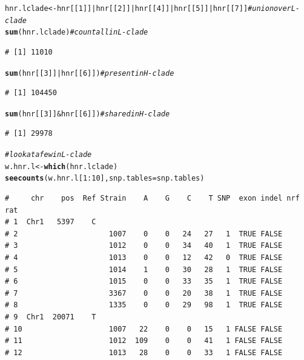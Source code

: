 \documentclass{article}\usepackage[]{graphicx}\usepackage[]{color}
\makeatletter
\newcommand{\hlnum}[1]{\textcolor[rgb]{0.686,0.059,0.569}{#1}}%
\newcommand{\hlcom}[1]{\textcolor[rgb]{0.678,0.584,0.686}{\textit{#1}}}%
\newcommand{\hlopt}[1]{\textcolor[rgb]{0,0,0}{#1}}%
\newcommand{\hlstd}[1]{\textcolor[rgb]{0.345,0.345,0.345}{#1}}%
\newcommand{\hlkwb}[1]{\textcolor[rgb]{0.69,0.353,0.396}{#1}}%
\newcommand{\hlkwc}[1]{\textcolor[rgb]{0.333,0.667,0.333}{#1}}%
\newcommand{\hlkwd}[1]{\textcolor[rgb]{0.737,0.353,0.396}{\textbf{#1}}}%
\newenvironment{kframe}{%
 \def\at@end@of@kframe{}%
 \ifinner\ifhmode%
  \def\at@end@of@kframe{\end{minipage}}%
  \begin{minipage}{\columnwidth}%
 \fi\fi%
 \def\FrameCommand##1{\hskip\@totalleftmargin \hskip-\fboxsep
 \colorbox{shadecolor}{##1}\hskip-\fboxsep
     \hskip-\linewidth \hskip-\@totalleftmargin \hskip\columnwidth}%
 \MakeFramed {\advance\hsize-\width
   \@totalleftmargin\z@ \linewidth\hsize
   \@setminipage}}%
 {\par\unskip\endMakeFramed%
 \at@end@of@kframe}
\newenvironment{knitrout}{}{} %
\makeatother
\begin{document}
\begin{knitrout}
\begin{kframe}
\begin{alltt}
\hlstd{hnr.lclade} \hlkwb{<-} \hlstd{hnr[[}\hlnum{1}\hlstd{]]} \hlopt{|} \hlstd{hnr[[}\hlnum{2}\hlstd{]]} \hlopt{|} \hlstd{hnr[[}\hlnum{4}\hlstd{]]} \hlopt{|} \hlstd{hnr[[}\hlnum{5}\hlstd{]]} \hlopt{|} \hlstd{hnr[[}\hlnum{7}\hlstd{]]}  \hlcom{# union over L-clade}
\hlkwd{sum}\hlstd{(hnr.lclade)}                                                     \hlcom{# count all in L-clade}
\end{alltt}
\begin{verbatim}
# [1] 11010
\end{verbatim}
\begin{alltt}
\hlkwd{sum}\hlstd{(hnr[[}\hlnum{3}\hlstd{]]} \hlopt{|} \hlstd{hnr[[}\hlnum{6}\hlstd{]])}                                            \hlcom{# present in H-clade}
\end{alltt}
\begin{verbatim}
# [1] 104450
\end{verbatim}
\begin{alltt}
\hlkwd{sum}\hlstd{(hnr[[}\hlnum{3}\hlstd{]]} \hlopt{&} \hlstd{hnr[[}\hlnum{6}\hlstd{]])}                                            \hlcom{# shared in H-clade}
\end{alltt}
\begin{verbatim}
# [1] 29978
\end{verbatim}
\begin{alltt}
\hlcom{# look at a few in L-clade}
\hlstd{w.hnr.l} \hlkwb{<-} \hlkwd{which}\hlstd{(hnr.lclade)}
\hlkwd{seecounts}\hlstd{(w.hnr.l[}\hlnum{1}\hlopt{:}\hlnum{10}\hlstd{],}\hlkwc{snp.tables}\hlstd{=snp.tables)}
\end{alltt}
\begin{verbatim}
#     chr    pos  Ref Strain    A    G    C    T SNP  exon indel nrf rat
# 1  Chr1   5397    C                                                   
# 2                     1007    0    0   24   27   1  TRUE FALSE        
# 3                     1012    0    0   34   40   1  TRUE FALSE        
# 4                     1013    0    0   12   42   0  TRUE FALSE        
# 5                     1014    1    0   30   28   1  TRUE FALSE        
# 6                     1015    0    0   33   35   1  TRUE FALSE        
# 7                     3367    0    0   20   38   1  TRUE FALSE        
# 8                     1335    0    0   29   98   1  TRUE FALSE        
# 9  Chr1  20071    T                                                   
# 10                    1007   22    0    0   15   1 FALSE FALSE        
# 11                    1012  109    0    0   41   1 FALSE FALSE        
# 12                    1013   28    0    0   33   1 FALSE FALSE        

\end{verbatim}
\end{kframe}
\end{knitrout}
\end{document}
